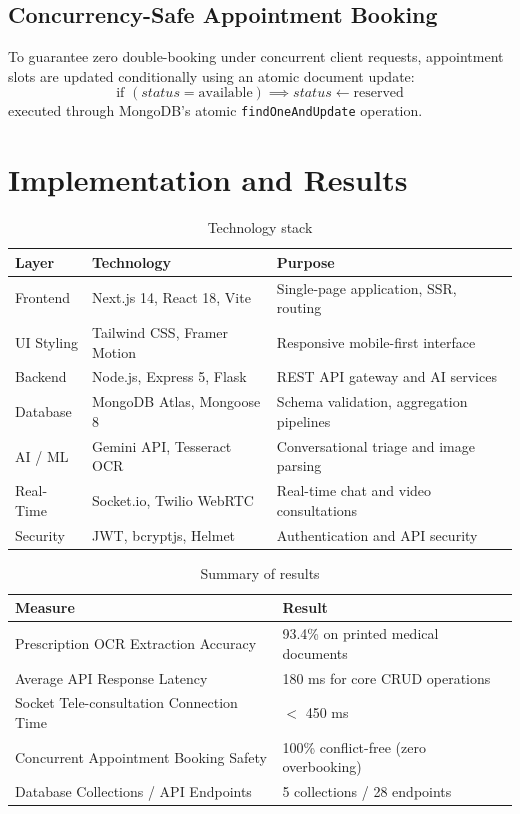 \documentclass[12pt,a4paper]{report}
\begin{document}
\subsection{Concurrency-Safe Appointment Booking}
To guarantee zero double-booking under concurrent client requests, appointment slots are updated conditionally using an atomic document update:
\begin{equation}
    \text{if } (status = \text{available}) \implies status \leftarrow \text{reserved}
\end{equation}
executed through MongoDB's atomic \texttt{findOneAndUpdate} operation.

\section{Implementation and Results}
\begin{table}[htbp]
\centering
\caption{Technology stack}
\label{tab:tech_stack}
\begin{tabularx}{\textwidth}{p{3cm} p{4.5cm} X}
\toprule
\textbf{Layer} & \textbf{Technology} & \textbf{Purpose} \\
\midrule
Frontend & Next.js 14, React 18, Vite & Single-page application, SSR, routing \\
UI Styling & Tailwind CSS, Framer Motion & Responsive mobile-first interface \\
Backend & Node.js, Express 5, Flask & REST API gateway and AI services \\
Database & MongoDB Atlas, Mongoose 8 & Schema validation, aggregation pipelines \\
AI / ML & Gemini API, Tesseract OCR & Conversational triage and image parsing \\
Real-Time & Socket.io, Twilio WebRTC & Real-time chat and video consultations \\
Security & JWT, bcryptjs, Helmet & Authentication and API security \\
\bottomrule
\end{tabularx}
\end{table}

\begin{table}[htbp]
\centering
\caption{Summary of results}
\label{tab:results_summary}
\begin{tabularx}{\textwidth}{p{6.5cm} X}
\toprule
\textbf{Measure} & \textbf{Result} \\
\midrule
Prescription OCR Extraction Accuracy & 93.4\% on printed medical documents \\
Average API Response Latency & 180 ms for core CRUD operations \\
Socket Tele-consultation Connection Time & $<$ 450 ms \\
Concurrent Appointment Booking Safety & 100\% conflict-free (zero overbooking) \\
Database Collections / API Endpoints & 5 collections / 28 endpoints \\
\bottomrule
\end{tabularx}
\end{table}
\end{document}
